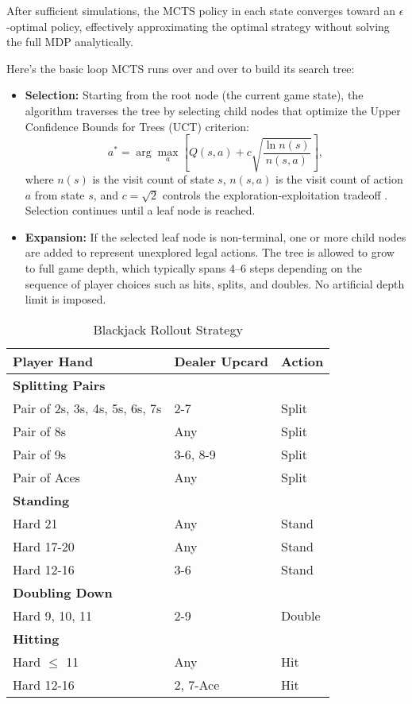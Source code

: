\documentclass[12pt,a4paper]{cibb}
\begin{document}
After sufficient simulations, the MCTS policy in each state converges toward an $\epsilon$-optimal policy, effectively approximating the optimal strategy without solving the full MDP analytically.

Here’s the basic loop MCTS runs over and over to build its search tree:

\begin{itemize}
    \item \textbf{Selection:} Starting from the root node (the current game state), the algorithm traverses the tree by selecting child nodes that optimize the Upper Confidence Bounds for Trees (UCT) criterion:
    \[
    a^* = \arg\max_a \left[ Q(s, a) + c \sqrt{\frac{\ln n(s)}{n(s, a)}} \right],
    \]
    where $n(s)$ is the visit count of state $s$, $n(s, a)$ is the visit count of action $a$ from state $s$, and $c = \sqrt{2}$ controls the exploration-exploitation tradeoff \cite{kocsis2006bandit}. Selection continues until a leaf node is reached.

    \item \textbf{Expansion:} If the selected leaf node is non-terminal, one or more child nodes are added to represent unexplored legal actions. The tree is allowed to grow to full game depth, which typically spans 4–6 steps depending on the sequence of player choices such as hits, splits, and doubles. No artificial depth limit is imposed.
\end{itemize} 

\begin{table}[H]
    \centering
    \begin{tabular}{lll}
        \hline
        \textbf{Player Hand} & \textbf{Dealer Upcard} & \textbf{Action} \\
        \hline
        \multicolumn{3}{l}{\textbf{Splitting Pairs}} \\
        Pair of 2s, 3s, 4s, 5s, 6s, 7s & 2-7 & Split \\
        Pair of 8s & Any & Split \\
        Pair of 9s & 3-6, 8-9 & Split \\
        Pair of Aces & Any & Split \\
        \hline
        \multicolumn{3}{l}{\textbf{Standing}} \\
        Hard 21 & Any & Stand \\
        Hard 17-20 & Any & Stand \\
        Hard 12-16 & 3-6 & Stand \\
        \hline
        \multicolumn{3}{l}{\textbf{Doubling Down}} \\
        Hard 9, 10, 11 & 2-9 & Double \\
        \hline
        \multicolumn{3}{l}{\textbf{Hitting}} \\
        Hard $\leq$ 11 & Any & Hit \\ 
        Hard 12-16 & 2, 7-Ace & Hit \\
        \hline
    \end{tabular}
    \caption{Blackjack Rollout Strategy}
    \label{tab:blackjack_strategy} %
\end{table}
\end{document}
